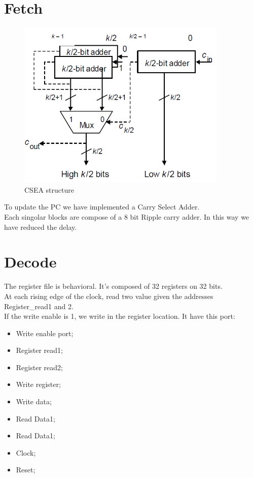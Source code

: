 \section{Fetch}
\begin{figure}[h!]
	\centering
	\includegraphics[width=10cm]{./images/CSEA}
	\caption{CSEA structure}
	\label{fig2.3}
\end{figure}
To update the PC we have implemented a Carry Select Adder. \\
Each singolar blocks are compose of a 8 bit Ripple carry adder. In this way we have reduced the delay.
\section{Decode}
The register file is behavioral. It's composed of 32 registers on 32 bits. \\
At each rising edge of the clock, read two value given the addresses Register\_read1 and 2.\\
If the write enable is 1, we write in the register location.
It have this port:
\begin{itemize}
	\item Write enable port;
	\item Register read1;
	\item Register read2;
	\item Write register;
	\item Write data;
	\item Read Data1;
	\item Read Data1;
	\item Clock;
	\item Reset;		
\end{itemize}

